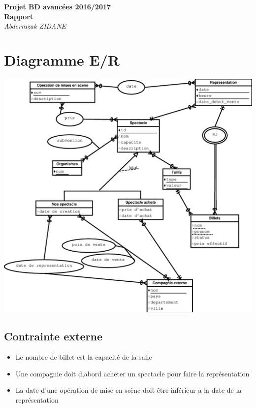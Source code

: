 \documentclass[10pt]{report}
\begin{document}
\begin{titlepage}
   \begin{center}
   	  \Large\textbf{Projet BD avancées 2016/2017}\\
      \Large\textbf{Rapport}\\
      \large\textit{Abderrazak ZIDANE}
   \end{center}
\end{titlepage}

\chapter{Diagramme E/R}
\includegraphics[width=15cm]{ER_Diagramme.eps}
\section{Contrainte externe}
\begin{itemize}
\item Le nombre de billet est la capacité de la salle
\item Une compagnie doit d,abord acheter un spectacle pour faire la représentation
\item La date d'une opération de mise en scène doit être inférieur a la date de la représentation
\end{itemize}
\end{document}
